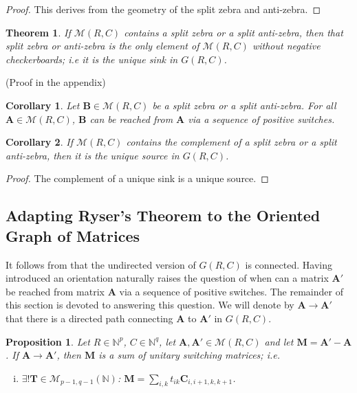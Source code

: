 \documentclass{article}
\newtheorem{theorem}{Theorem}
\newtheorem{prop}{Proposition}
\newtheorem{corollary}{Corollary}
\newcommand{\N}{\mathbb{N}}
\newcommand{\MM}{\mathcal M}
\newcommand{\rar}{\rightarrow}
\newcommand{\A}{\mathbf A}
\newcommand{\C}{\mathbf C}
\newcommand{\M}{\mathbf M}
\newcommand{\T}{\mathbf T}
\begin{document}
\begin{proof}
This derives from the geometry of the split zebra and anti-zebra.
\end{proof}






\begin{theorem}\label{th:zebra}
If $\MM(R,C)$ contains a split zebra or a split anti-zebra, then that split zebra or anti-zebra is the only element of $\MM(R,C)$ without negative checkerboards; i.e it is the unique sink in $G(R,C)$.
\end{theorem}

\noindent (Proof in the appendix)



\begin{corollary}
Let $\mathbf{B}\in\MM(R,C)$ be a split zebra or a split anti-zebra. For all $\A\in \MM(R,C)$, $\mathbf{B}$ can be reached from $\A$ via a sequence of positive switches.
\end{corollary}

\begin{corollary}
If $\MM(R,C)$ contains the complement of a split zebra or a split anti-zebra, then it is the unique source in $G(R,C)$.
\end{corollary}

\begin{proof}
The complement of a unique sink is a unique source.
\end{proof}




\subsection{Adapting Ryser's Theorem to the Oriented Graph of Matrices}

It follows from  that the undirected version of $G(R,C)$ is connected. Having introduced an orientation naturally raises the question of when can a matrix $\A'$ be reached from matrix $\A$ via a sequence of positive switches. The remainder of this section is devoted to answering this question. We will denote by $\A\rar \A'$ that there is a directed path connecting $\A$ to $\A'$ in $G(R,C)$.

\begin{prop}\label{NC}
Let $R\in \N^p$, $C\in \N^q$, let $\A,\A' \in \MM(R,C)$ and let $\M=\A'-\A$. If $\A\rar \A'$, then $\M$ is a sum of unitary switching matrices; i.e. \begin{enumerate}[(i)] 
\item $\exists !\T\in \MM_{p-1,q-1}(\N)$: $\M=\sum_{i,k} t_{ik}\C_{i,i+1,k,k+1}$.
\end{enumerate}
\end{prop}
\end{document}
